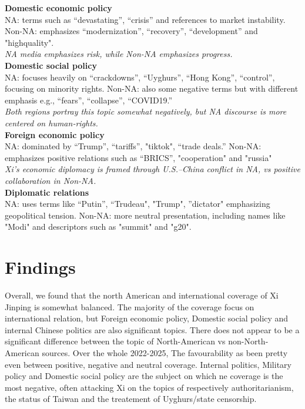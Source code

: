 \documentclass{article}
\begin{document}
   \textbf{Domestic economic policy} \\
   NA: terms such as “devastating”, “crisis” and references to market instability.
   Non-NA: emphasizes “modernization”, “recovery”, “development” and "highquality".
   \\
      \textit{NA media emphasizes risk, while Non-NA emphasizes progress.}
   \\
   \textbf{Domestic social policy} \\
   NA: focuses heavily on “crackdowns”, “Uyghurs”, “Hong Kong”, “control”, focusing on minority rights.
   Non-NA: also some negative terms but with different emphasis e.g., “fears”, “collapse”, “COVID19.”
   \\
      \textit{Both regions portray this topic somewhat negatively, but NA discourse is more centered on human-rights.}
   \\
   \textbf{Foreign economic policy}
   \\
   NA: dominated by “Trump”, “tariffs”, "tiktok", “trade deals.”
   Non-NA: emphasizes positive relations such as “BRICS”, "cooperation" and "russia"
   \\
      \textit{Xi’s economic diplomacy is framed through U.S.–China conflict in NA, vs positive collaboration in Non-NA.}
   \\
      \textbf{Diplomatic relations}
   \\
   NA: uses terms like “Putin”, “Trudeau", "Trump", ”dictator" emphasizing geopolitical tension.
   Non-NA: more neutral presentation, including names like "Modi" and descriptors such as "summit" and "g20".
   




   \section{Findings} %
   Overall, we found that the north American and international coverage of Xi Jinping is somewhat balanced. 
   The majority of the coverage focus on international relation, but Foreign economic policy, Domestic social 
   policy and internal Chinese politics are also significant topics. There does not appear to be a significant 
   difference between the topic of North-American vs non-North-American sources. Over the whole 2022-2025, The 
   favourability as been pretty even between positive, negative and neutral coverage. Internal politics, 
   Military policy and Domestic social policy are the subject on which ne coverage is the most negative, 
   often attacking Xi on the topics of respectively authoritarianism, the status of Taiwan and the treatement 
   of Uyghurs/state censorship. \\
    
\end{document}
